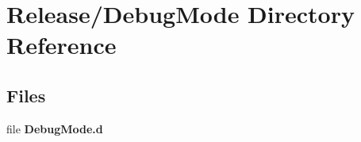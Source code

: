 \section{Release/\+Debug\+Mode Directory Reference}
\label{dir_fd1414a720305a734124c2837c8b6d29}
\subsection*{Files}
\begin{DoxyCompactItemize}
\item 
file {\bfseries Debug\+Mode.\+d}
\end{DoxyCompactItemize}
